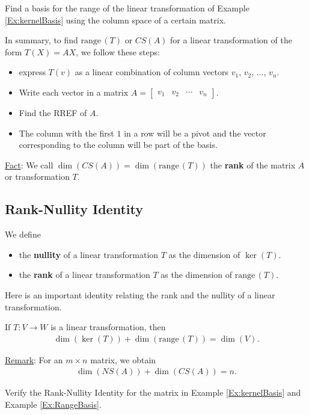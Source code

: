 \documentclass[12pt,a4paper]{article}
\newcommand{\range}{\mathrm{range}\,}
\newcounter{example}[section]
\begin{document}
	\begin{example}\label{Ex:RangeBasis}
	Find a basis for the range of the linear transformation of Example \ref{Ex:kernelBasis} using the column space of a certain matrix.
	\end{example}
	
	\newpage
	
	In summary, to find $\range (T)$ or $CS (A)$ for a linear transformation of the form $T(X) = AX$, we follow these steps:
		\begin{itemize}
		\item express $T(v)$ as a linear combination of column vectors $v_1$, $v_2$, $\ldots$, $v_n$.
		\item Write each vector in a matrix $A = \begin{bmatrix} v_1 & v_2 & \cdots & v_n \end{bmatrix}$.
		\item Find the RREF of $A$.
		\item The column with the first $1$ in a row will be a pivot and the vector corresponding to the column will be part of the basis.
		\end{itemize}
	
	\underline{Fact}: We call $\dim (CS (A)) = \dim (\range (T))$ the \textbf{rank} of the matrix $A$ or transformation $T$.
	
	\subsection{Rank-Nullity Identity}
	We define
		\begin{itemize}
		\item the \textbf{nullity} of a linear transformation $T$ as the dimension of $\ker (T)$.
		\item the \textbf{rank} of a linear transformation $T$ as the dimension of $\range (T)$.
		\end{itemize}
	 
	 Here is an important identity relating the rank and the nullity of a linear transformation.
	 
	 \vspace*{10pt}
	 
	 \begin{theorem}
	 If $T : V \rightarrow W$ is a linear transformation, then
	 	\begin{align*}
	 	\dim (\ker (T)) + \dim (\range (T)) = \dim (V) .
	 	\end{align*}
	 \end{theorem}
	 
	 \underline{Remark}: For an $m \times n$ matrix, we obtain
	 	\begin{align*}
	 	\dim (NS (A)) + \dim (CS (A)) = n .
	 	\end{align*}
	 
	 \vspace*{14pt}
	 
	 \begin{example}
	 Verify the Rank-Nullity Identity for the matrix in Example \ref{Ex:kernelBasis} and Example \ref{Ex:RangeBasis}.
	 \end{example}
\end{document}

